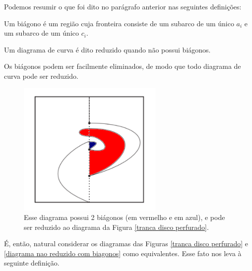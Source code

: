 	\par\vspace{0.3cm} Podemos resumir o que foi dito no parágrafo anterior nas seguintes definições:
	\begin{deff}
		\label{def biagono}
		Um biágono é um região cuja fronteira consiste de um subarco de um único $a_i$ e um subarco de um único $c_i$.
	\end{deff}
	\begin{deff}
		\label{def reducao}
		Um diagrama de curva é dito reduzido quando não possui biágonos.
	\end{deff}
	\par\vspace{0.3cm} Os biágonos podem ser facilmente eliminados, de modo que todo diagrama de curva pode ser reduzido. 
	
	\begin{figure}[H]
		\begin{center}
			\includegraphics[width=7cm]{Images/biagonos.png}
		\end{center}\caption{Esse diagrama possui 2 biágonos (em vermelho e em azul), e pode ser reduzido ao diagrama da Figura \eqref{tranca disco perfurado}.}
		\label{diagrama nao reduzido com biagonos}
	\end{figure}
	\par\vspace{0.3cm} É, então, natural considerar os diagramas das Figuras \eqref{tranca disco perfurado} e \eqref{diagrama nao reduzido com biagonos} como equivalentes. Esse fato nos leva à seguinte definição.
	
